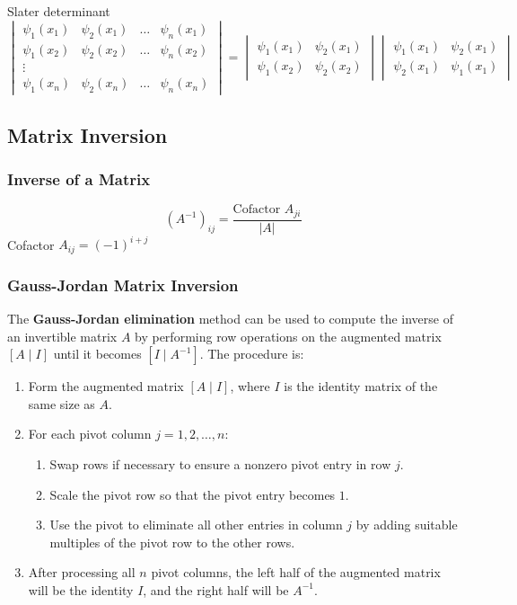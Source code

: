 \documentclass[12pt, a4paper]{report}
\begin{document}
Slater determinant
$$
\begin{vmatrix}
\psi_1(x_1) & \psi_2(x_1) & \dots & \psi_n(x_1) \\
\psi_1(x_2) & \psi_2(x_2) & \dots & \psi_n(x_2) \\
\vdots \\
\psi_1(x_n) & \psi_2(x_n) & \dots & \psi_n(x_n)
\end{vmatrix}
=
\begin{vmatrix}
\psi_1(x_1) & \psi_2(x_1) \\
\psi_1(x_2) & \psi_2(x_2)
\end{vmatrix}
\begin{vmatrix}
\psi_1(x_1) & \psi_2(x_1) \\
\psi_2(x_1) & \psi_1(x_1)
\end{vmatrix}
$$

\subsection{Matrix Inversion}
\subsubsection{Inverse of a Matrix}
$$
(A^{-1})_{ij} = \frac{\text{Cofactor } A_{ji}}{|A|}
$$
Cofactor $A_{ij} = (-1)^{i+j}$

\subsubsection{Gauss-Jordan Matrix Inversion}
The \textbf{Gauss-Jordan elimination} method can be used to compute the inverse of an invertible matrix $A$ by performing row operations on the augmented matrix $[A\mid I]$ until it becomes $[I\mid A^{-1}]$. The procedure is:
\begin{enumerate}
    \item Form the augmented matrix $[A\mid I]$, where $I$ is the identity matrix of the same size as $A$.
    \item For each pivot column $j=1,2,\dots,n$:
    \begin{enumerate}
        \item Swap rows if necessary to ensure a nonzero pivot entry in row $j$.
        \item Scale the pivot row so that the pivot entry becomes $1$.
        \item Use the pivot to eliminate all other entries in column $j$ by adding suitable multiples of the pivot row to the other rows.
    \end{enumerate}
    \item After processing all $n$ pivot columns, the left half of the augmented matrix will be the identity $I$, and the right half will be $A^{-1}$.
\end{enumerate}
\end{document}
